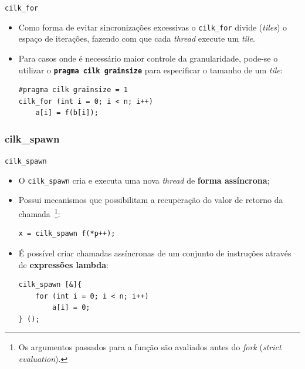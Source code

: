 \documentclass{beamer}
\begin{document}
\begin{frame}[fragile]{\texttt{cilk\_for}}
\begin{itemize}
    \item Como forma de evitar sincronizações excessivas o 
    \texttt{cilk\_for} divide (\textit{tiles}) o espaço de iterações, fazendo 
    com que cada \textit{thread} execute um \textit{tile}.
    \item Para casos onde é necessário maior controle da granularidade,
    pode-se o utilizar o \textbf{\texttt{pragma cilk grainsize}} para
    especificar o tamanho de um \textit{tile}:
\begin{lstlisting}
#pragma cilk grainsize = 1
cilk_for (int i = 0; i < n; i++)
    a[i] = f(b[i]);
\end{lstlisting}
\end{itemize}

\end{frame}
{
\subsubsection{cilk\_spawn}
\begin{frame}[fragile]{\texttt{cilk\_spawn}}
\begin{itemize}
    \item O \texttt{cilk\_spawn} cria e executa uma nova \textit{thread}
    de \textbf{forma assíncrona};
    \item Possui mecanismos que possibilitam a recuperação do valor de retorno
    da chamada~\footnote{Os argumentos passados para a função são
    avaliados antes do \textit{fork} (\textit{strict evaluation}).}:
\begin{lstlisting}
x = cilk_spawn f(*p++);
\end{lstlisting}
    \item É possível criar chamadas assíncronas de um conjunto de instruções
    através de \textbf{expressões lambda}:
\begin{lstlisting}
cilk_spawn [&]{
    for (int i = 0; i < n; i++)
        a[i] = 0;
} ();
\end{lstlisting}
\end{itemize}
\end{frame}
}
\end{document}
